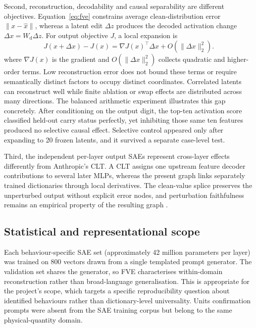 \documentclass[11pt,a4paper]{article}
\begin{document}
Second, reconstruction, decodability and causal separability are different objectives. Equation~\ref{eq:fve} constrains average clean-distribution error $\lVert x-\hat{x}\rVert$, whereas a latent edit $\Delta z$ produces the decoded activation change $\Delta x=W_{\mathrm d}\Delta z$. For output objective $J$, a local expansion is
\begin{equation}     J(x+\Delta x)-J(x)     =\nabla J(x)^{\top}\Delta x+O(\lVert\Delta x\rVert_2^2).
\end{equation} where $\nabla J(x)$ is the gradient and $O(\lVert\Delta x\rVert_2^2)$ collects quadratic and higher-order terms. Low reconstruction error does not bound these terms or require semantically distinct factors to occupy distinct coordinates. Correlated latents can reconstruct well while finite ablation or swap effects are distributed across many directions. The balanced arithmetic experiment illustrates this gap concretely. After conditioning on the output digit, the top-ten activation score classified held-out carry status perfectly, yet inhibiting those same ten features produced no selective causal effect. Selective control appeared only after expanding to 20 frozen latents, and it survived a separate case-level test.

Third, the independent per-layer output SAEs represent cross-layer effects differently from Anthropic's CLT. A CLT assigns one upstream feature decoder contributions to several later MLPs, whereas the present graph links separately trained dictionaries through local derivatives. The clean-value splice preserves the unperturbed output without explicit error nodes, and perturbation faithfulness remains an empirical property of the resulting graph \cite{ameisen2025circuit}.

\subsection{Statistical and representational scope}

Each behaviour-specific SAE set (approximately 42 million parameters per layer) was trained on 800 vectors drawn from a single templated prompt generator. The validation set shares the generator, so FVE characterises within-domain reconstruction rather than broad-language generalisation. This is appropriate for the project's scope, which targets a specific reproducibility question about identified behaviours rather than dictionary-level universality. Units confirmation prompts were absent from the SAE training corpus but belong to the same physical-quantity domain.
\end{document}
